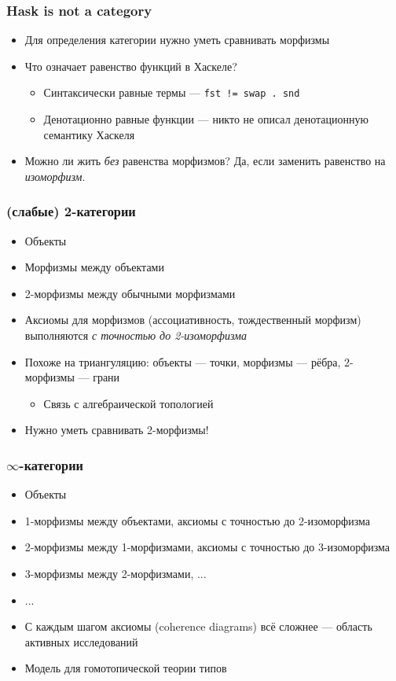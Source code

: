 \documentclass{beamer}
\begin{document}
\begin{frame}
\frametitle{Hask is not a category}
\begin{itemize}
\item Для определения категории нужно уметь сравнивать морфизмы
\item Что означает равенство функций в Хаскеле?
\pause
\begin{itemize}
\item Синтаксически равные термы \pause --- \texttt{fst != swap . snd}
\pause
\item Денотационно равные функции \pause --- никто не описал денотационную семантику Хаскеля
\end{itemize}
\pause
\item Можно ли жить \textit{без} равенства морфизмов? \pause Да, если заменить равенство на \textit{изоморфизм}.
\end{itemize}
\end{frame}

\begin{frame}
\frametitle{(слабые) 2-категории}
\begin{itemize}
\item Объекты
\item Морфизмы между объектами
\pause
\item 2-морфизмы между обычными морфизмами
\pause
\item Аксиомы для морфизмов (ассоциативность, тождественный морфизм) выполняются \textit{с точностью до 2-изоморфизма}
\pause
\item Похоже на триангуляцию: объекты --- точки, морфизмы --- рёбра, 2-морфизмы --- грани
\begin{itemize}
\item Связь с алгебраической топологией
\end{itemize}
\pause
\item Нужно уметь сравнивать 2-морфизмы!
\end{itemize}
\end{frame}

\begin{frame}
\frametitle{\begin{math}\infty\end{math}-категории}
\begin{itemize}
\item Объекты
\item 1-морфизмы между объектами, аксиомы с точностью до 2-изоморфизма
\item 2-морфизмы между 1-морфизмами, аксиомы с точностью до 3-изоморфизма
\item 3-морфизмы между 2-морфизмами, ...
\item ...
\pause
\item С каждым шагом аксиомы (coherence diagrams) всё сложнее --- область активных исследований
\item Модель для гомотопической теории типов
\end{itemize}
\end{frame}
\end{document}
